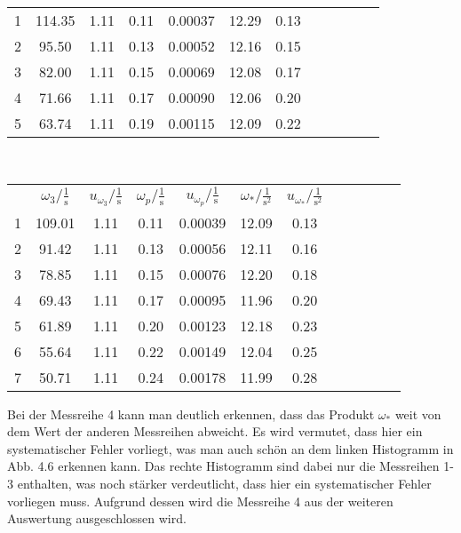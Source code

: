 \begin{center}
\begin{tabular}{gccccccccccc}
        1 &  114.35 &  1.11 &  0.11 &  0.00037 &  12.29 &  0.13 \\
        2 &   95.50 &  1.11 &  0.13 &  0.00052 &  12.16 &  0.15 \\
        3 &   82.00 &  1.11 &  0.15 &  0.00069 &  12.08 &  0.17 \\
        4 &   71.66 &  1.11 &  0.17 &  0.00090 &  12.06 &  0.20 \\
        5 &   63.74 &  1.11 &  0.19 &  0.00115 &  12.09 &  0.22 \\
    \end{tabular}\\
    \newpage
    \begin{tabular}{gccccccccccc}
         &      $\omega_3/\frac{1}{\text{s}}$ &  $u_{\omega_3}/\frac{1}{\text{s}}$ &    $\omega_p/\frac{1}{\text{s}}$ &     $u_{\omega_p}/\frac{1}{\text{s}}$ &     $\omega_*/\frac{1}{\text{s}^2}$&  $u_{\omega_*}/\frac{1}{\text{s}^2}$\\
        1 &  109.01 &  1.11 &  0.11 &  0.00039 &  12.09 &  0.13 \\
        2 &   91.42 &  1.11 &  0.13 &  0.00056 &  12.11 &  0.16 \\
        3 &   78.85 &  1.11 &  0.15 &  0.00076 &  12.20 &  0.18 \\
        4 &   69.43 &  1.11 &  0.17 &  0.00095 &  11.96 &  0.20 \\
        5 &   61.89 &  1.11 &  0.20 &  0.00123 &  12.18 &  0.23 \\
        6 &   55.64 &  1.11 &  0.22 &  0.00149 &  12.04 &  0.25 \\
        7 &   50.71 &  1.11 &  0.24 &  0.00178 &  11.99 &  0.28 \\
    \end{tabular}
\end{center}
Bei der Messreihe 4 kann man deutlich erkennen, dass das Produkt $\omega_*$ weit von dem Wert der anderen Messreihen abweicht. Es wird vermutet, dass hier ein systematischer Fehler vorliegt, was man auch schön an dem linken Histogramm in Abb. 4.6 erkennen kann. Das rechte Histogramm sind dabei nur die Messreihen 1-3 enthalten, was noch stärker verdeutlicht, dass hier ein systematischer Fehler vorliegen muss. Aufgrund dessen wird die Messreihe 4 aus der weiteren Auswertung ausgeschlossen wird. 
